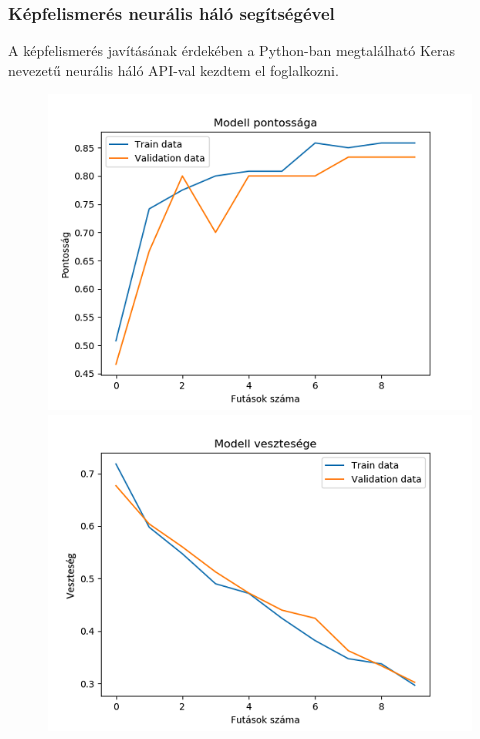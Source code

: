 \documentclass{beamer}
\begin{document}
\begin{frame}[fragile]
\frametitle{Képfelismerés neurális háló segítségével}

A képfelismerés javításának érdekében a Python-ban megtalálható Keras nevezetű neurális háló API-val kezdtem el foglalkozni.

\begin{figure}[!tbp]
  \centering
  \begin{minipage}[b]{0.48\textwidth}
    \includegraphics[width=\textwidth]{images/accuracy.png}
  \end{minipage}
  \hfill
  \begin{minipage}[b]{0.48\textwidth}
    \includegraphics[width=\textwidth]{images/loss.png}
  \end{minipage}
\end{figure}

\end{frame}
\end{document}
